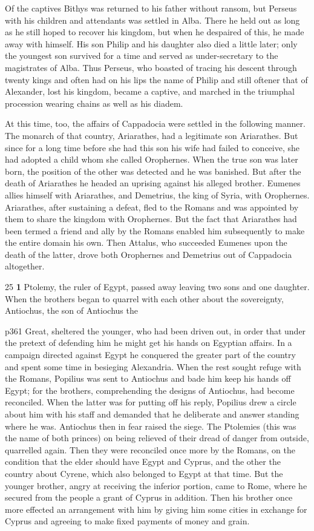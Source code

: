 Of the captives Bithys was returned to his father without ransom, but Perseus with his children and attendants was settled in Alba. There he held out as long as he still hoped to recover his kingdom, but when he despaired of this, he made away with himself. His son Philip and his daughter also died a little later; only the youngest son survived for a time and served as under-secretary to the magistrates of Alba. Thus Perseus, who boasted of tra­cing his descent through twenty kings and often had on his lips the name of Philip and still oftener that of Alexander, lost his kingdom, became a captive, and marched in the triumphal procession wearing chains as well as his diadem.

At this time, too, the affairs of Cappadocia were settled in the following manner. The monarch of that country, Ariarathes, had a legitimate son Ariarathes. But since for a long time before she had this son his wife had failed to conceive, she had adopted a child whom she called Orophernes. When the true son was later born, the position of the other was detected and he was banished. But after the death of Ariarathes he headed an uprising against his alleged brother. Eumenes allies himself with Ariarathes, and Demetrius, the king of Syria, with Orophernes. Ariarathes, after sustaining a defeat, fled to the Romans and was appointed by them to share the kingdom with Orophernes. But the fact that Ariarathes had been termed a friend and ally by the Romans enabled him subsequently to make the entire domain his own. Then Attalus, who succeeded Eumenes upon the death of the latter, drove both Orophernes and Demetrius out of Cappadocia altogether.

25
\textbf{1} Ptolemy, the ruler of Egypt, passed away leaving two sons and one daughter. When the brothers began to quarrel with each other about the sovereignty, Antiochus, the son of Antiochus the

p361 Great, sheltered the younger, who had been driven out, in order that under the pretext of defending him he might get his hands on Egyptian affairs. In a campaign directed against Egypt he conquered the greater part of the country and spent some time in besieging Alexandria. When the rest sought refuge with the Romans, Popilius was sent to Antiochus and bade him keep his hands off Egypt; for the brothers, comprehending the designs of Antiochus, had become reconciled. When the latter was for putting off his reply, Popilius drew a circle about him with his staff and demanded that he deliberate and answer standing where he was. Antiochus then in fear raised the siege. The Ptolemies (this was the name of both princes) on being relieved of their dread of danger from outside, quarrelled again. Then they were reconciled once more by the Romans, on the condition that the elder should have Egypt and Cyprus, and the other the country about Cyrene, which also belonged to Egypt at that time. But the younger brother, angry at receiving the inferior portion, came to Rome, where he secured from the people a grant of Cyprus in addition. Then his brother once more effected an arrangement with him by giving him some cities in exchange for Cyprus and agreeing to make fixed payments of money and grain.


